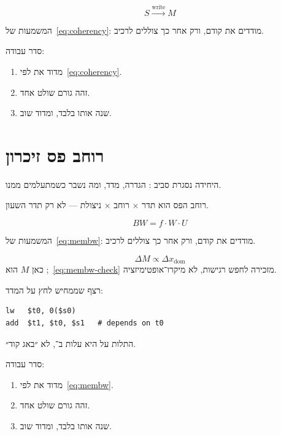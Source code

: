 \begin{equation}
\label{eq:coherency}
S \xrightarrow{\mathrm{write}} M
\end{equation}

המשמעות של~\eqref{eq:coherency}: מודדים את  קודם, ורק אחר כך צוללים לרכיב.

סדר עבודה:
\begin{enumerate}
\item[(\textbf{א})] מדוד את  לפי~\eqref{eq:coherency}.
\item[(\textbf{ב})] זהה גורם שולט אחד.
\item[(\textbf{ג})] שנה אותו בלבד, ומדוד שוב.
\end{enumerate}

\chapter{רוחב פס זיכרון}
\label{ch:membw}

היחידה נסגרת סביב : הגדרה, מדד, ומה נשבר כשמתעלמים ממנו.

\begin{keybox}[frametitle={רעיון מפתח — רוחב פס זיכרון}]
רוחב הפס הוא תדר $\times$ רוחב $\times$ ניצולת — לא רק תדר השעון.
\end{keybox}

\begin{equation}
\label{eq:membw}
BW = f\cdot W\cdot U
\end{equation}

המשמעות של~\eqref{eq:membw}: מודדים את  קודם, ורק אחר כך צוללים לרכיב.

\begin{equation}
\label{eq:membw-check}
\Delta M \propto \Delta x_{\mathrm{dom}}
\end{equation}
כאן $M$ הוא ;~\eqref{eq:membw-check} מזכירה לחפש רגישות, לא מיקרו־אופטימיזציה.

רצף שממחיש לחץ על המדד:
\begin{asmblock}
\begin{lstlisting}[style=asm]
lw   $t0, 0($s0)
add  $t1, $t0, $s1   # depends on t0
\end{lstlisting}
\end{asmblock}
התלות על  היא עלות ב־, לא ״באג קוד״.

סדר עבודה:
\begin{enumerate}
\item[(\textbf{א})] מדוד את  לפי~\eqref{eq:membw}.
\item[(\textbf{ב})] זהה גורם שולט אחד.
\item[(\textbf{ג})] שנה אותו בלבד, ומדוד שוב.
\end{enumerate}


